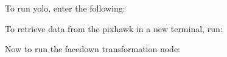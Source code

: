 \begin{DoxyCode}{0}
\end{DoxyCode}


To run yolo, enter the following\+: 
\begin{DoxyCode}{0}
\end{DoxyCode}


To retrieve data from the pixhawk in a new terminal, run\+: 
\begin{DoxyCode}{0}
\end{DoxyCode}


Now to run the facedown transformation node\+: 
\begin{DoxyCode}{0}
\end{DoxyCode}
 